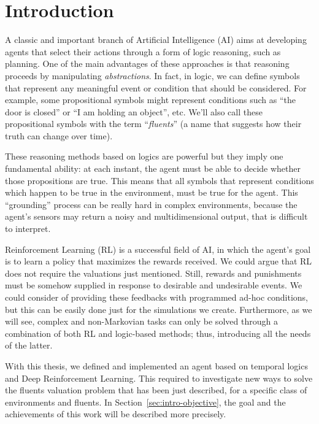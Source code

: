 \chapter{Introduction}

A classic and important branch of Artificial Intelligence (AI) aims at
developing agents that select their actions through a form of logic reasoning,
such as planning. One of the main advantages of these approaches is that
reasoning proceeds by manipulating \emph{abstractions}. In fact, in logic,
we can define symbols that represent any meaningful event or condition that
should be considered. For example, some propositional symbols might represent
conditions such as ``the door is closed'' or ``I am holding an object'', etc.
We'll also call these propositional symbols with the term ``\emph{fluents}''
(a name that suggests how their truth can change over time).

These reasoning methods based on logics are powerful but they imply one
fundamental ability: at each instant, the agent must be able to decide whether
those propositions are true. This means that all symbols that represent
conditions which happen to be true in the environment, must be true for the
agent. This ``grounding'' process can be really hard in complex environments,
because the agent's sensors may return a noisy and multidimensional output,
that is difficult to interpret.

Reinforcement Learning (RL) is a successful field of AI, in which the
agent's goal is to learn a policy that maximizes the rewards received.  We
could argue that RL does not require the valuations just mentioned. Still,
rewards and punishments must be somehow supplied in response to desirable and
undesirable events. We could consider of providing these feedbacks with
programmed ad-hoc conditions, but this can be easily done just for the
simulations we create. Furthermore, as we will see, complex and non-Markovian
tasks can only be solved through a combination of both RL and logic-based
methods; thus, introducing all the needs of the latter.

With this thesis, we defined and implemented an agent based on temporal logics
and Deep Reinforcement Learning. This required to investigate new ways to
solve the fluents valuation problem that has been just described, for a
specific class of environments and fluents. In
Section~\ref{sec:intro-objective}, the goal and the achievements of this work
will be described more precisely.


